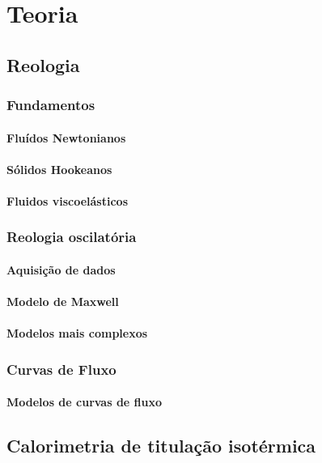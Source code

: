 \part{Teoria}
	\chapter{Reologia}
		\section{Fundamentos}
			\subsection{Fluídos Newtonianos}
			\subsection{Sólidos Hookeanos}
			\subsection{Fluidos viscoelásticos}
		\section{Reologia oscilatória}
			\subsection{Aquisição de dados}
			\subsection{Modelo de Maxwell}
			\subsection{Modelos mais complexos}
		\section{Curvas de Fluxo}
			\subsection{Modelos de curvas de fluxo}
	\chapter{Calorimetria de titulação isotérmica}
